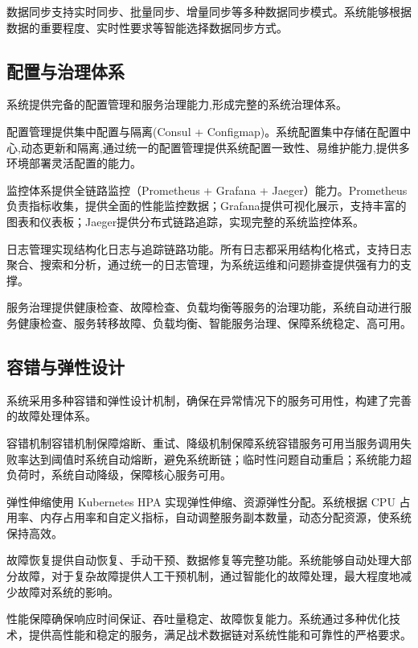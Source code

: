 数据同步支持实时同步、批量同步、增量同步等多种数据同步模式。系统能够根据数据的重要程度、实时性要求等智能选择数据同步方式。

\subsection{配置与治理体系}

系统提供完备的配置管理和服务治理能力,形成完整的系统治理体系。

配置管理提供集中配置与隔离(Consul + Configmap)。系统配置集中存储在配置中心,动态更新和隔离,通过统一的配置管理提供系统配置一致性、易维护能力,提供多环境部署灵活配置的能力。

监控体系提供全链路监控（Prometheus + Grafana + Jaeger）能力。Prometheus负责指标收集，提供全面的性能监控数据；Grafana提供可视化展示，支持丰富的图表和仪表板；Jaeger提供分布式链路追踪，实现完整的系统监控体系。

日志管理实现结构化日志与追踪链路功能。所有日志都采用结构化格式，支持日志聚合、搜索和分析，通过统一的日志管理，为系统运维和问题排查提供强有力的支撑。

服务治理提供健康检查、故障检查、负载均衡等服务的治理功能，系统自动进行服务健康检查、服务转移故障、负载均衡、智能服务治理、保障系统稳定、高可用。

\subsection{容错与弹性设计}

系统采用多种容错和弹性设计机制，确保在异常情况下的服务可用性，构建了完善的故障处理体系。

容错机制容错机制保障熔断、重试、降级机制保障系统容错服务可用当服务调用失败率达到阈值时系统自动熔断，避免系统断链；临时性问题自动重启；系统能力超负荷时，系统自动降级，保障核心服务可用。

弹性伸缩使用 Kubernetes HPA 实现弹性伸缩、资源弹性分配。系统根据 CPU 占用率、内存占用率和自定义指标，自动调整服务副本数量，动态分配资源，使系统保持高效。

故障恢复提供自动恢复、手动干预、数据修复等完整功能。系统能够自动处理大部分故障，对于复杂故障提供人工干预机制，通过智能化的故障处理，最大程度地减少故障对系统的影响。

性能保障确保响应时间保证、吞吐量稳定、故障恢复能力。系统通过多种优化技术，提供高性能和稳定的服务，满足战术数据链对系统性能和可靠性的严格要求。
